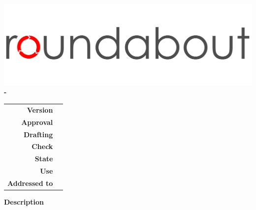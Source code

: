 \thispagestyle{empty}
\begin{titlepage}
	\begin{center}
		\includegraphics[scale=0.25]{./res/img/logo.png}\\
		\large \textbf{\Gruppo\hspace{1.5mm}-\hspace{1.5mm}\NomeProgetto}
		\vfill
		\Huge \textbf{\docTitle}
		\vspace*{\fill}
        \vfill
        \large

        \begin{tabular}{r|l}
			\textbf{Version} & \docVersion \\
			\textbf{Approval} & \approv \\
			\textbf{Drafting} & \red \\
			\textbf{Check} & \ver \\
			\textbf{State} & \state \\
			\textbf{Use} & \use \\
			\textbf{Addressed to} & \destinatari\\
		\end{tabular}

		\vfill
		\normalsize
		\textbf{Description}\\
		\textit{\desc} \\
		\vfill
		\small\texttt{\Mail}
	\end{center}
\end{titlepage}
